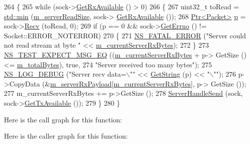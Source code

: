 \begin{DoxyCode}
264 \{
265   \textcolor{keywordflow}{while} (sock->\hyperlink{classns3_1_1Socket_ad35d8931e53ae0754ee864acb1cecd0e}{GetRxAvailable} () > 0)
266     \{
267       uint32\_t toRead = \hyperlink{80211b_8c_ac6afabdc09a49a433ee19d8a9486056d}{std::min} (\hyperlink{classTcpTestCase_a0487d4363885a37e702f1d6576435f0f}{m\_serverReadSize}, sock->
      \hyperlink{classns3_1_1Socket_ad35d8931e53ae0754ee864acb1cecd0e}{GetRxAvailable} ());
268       \hyperlink{classns3_1_1Ptr}{Ptr<Packet>} \hyperlink{lte__link__budget_8m_ac9de518908a968428863f829398a4e62}{p} = sock->\hyperlink{classns3_1_1Socket_a8949b1f844aae563446f2f4c5be8827a}{Recv} (toRead, 0);
269       \textcolor{keywordflow}{if} (p == 0 && sock->\hyperlink{classns3_1_1Socket_ae489616249d946f3c0dc831c05d0d711}{GetErrno} () != Socket::ERROR\_NOTERROR)
270         \{
271           \hyperlink{group__fatal_ga5131d5e3f75d7d4cbfd706ac456fdc85}{NS\_FATAL\_ERROR} (\textcolor{stringliteral}{"Server could not read stream at byte "} << 
      \hyperlink{classTcpTestCase_aef99b385054dd7eb73a7e45b2ce3d976}{m\_currentServerRxBytes});
272         \}
273       \hyperlink{group__testing_ga7304ba46a28d8cf08dfdfd6499cf7068}{NS\_TEST\_EXPECT\_MSG\_EQ} ((\hyperlink{classTcpTestCase_aef99b385054dd7eb73a7e45b2ce3d976}{m\_currentServerRxBytes} + p->
      GetSize () <= \hyperlink{classTcpTestCase_a9b4497e157a0b1fb7fdf90e833696201}{m\_totalBytes}), \textcolor{keyword}{true},
274                              \textcolor{stringliteral}{"Server received too many bytes"});
275       \hyperlink{group__logging_ga413f1886406d49f59a6a0a89b77b4d0a}{NS\_LOG\_DEBUG} (\textcolor{stringliteral}{"Server recv data=\(\backslash\)""} << \hyperlink{tcp-test_8cc_ab9425fc2dc406843f955d1565b7fc804}{GetString} (p) << \textcolor{stringliteral}{"\(\backslash\)""});
276       p->CopyData (&\hyperlink{classTcpTestCase_af1647be1c24b49579653f2c691bc802b}{m\_serverRxPayload}[\hyperlink{classTcpTestCase_aef99b385054dd7eb73a7e45b2ce3d976}{m\_currentServerRxBytes}], p->
      GetSize ());
277       m\_currentServerRxBytes += p->GetSize ();
278       \hyperlink{classTcpTestCase_a1ba2bc3a0a5e84e07437e48e632fdbda}{ServerHandleSend} (sock, sock->\hyperlink{classns3_1_1Socket_ae7cf62e3acf44106bfa1d40eaeaec151}{GetTxAvailable} ());
279     \}
280 \}
\end{DoxyCode}


Here is the call graph for this function\+:




Here is the caller graph for this function\+:


